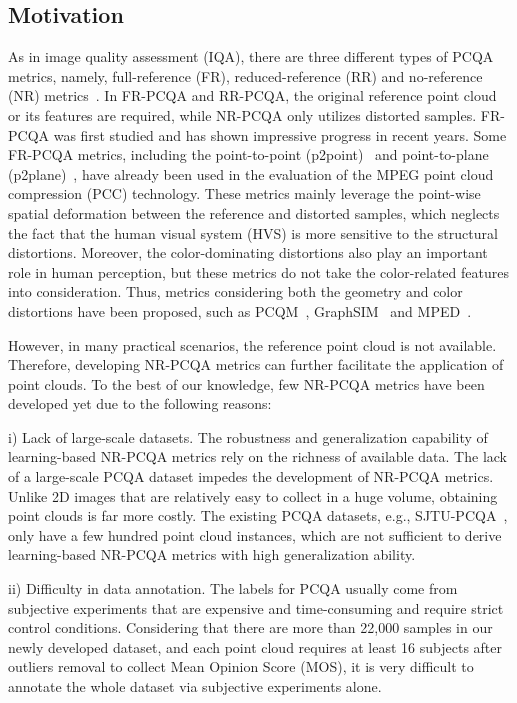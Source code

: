 \documentclass[acmsmall]{acmart}
\begin{document}
\subsection{Motivation}

\par As in image quality assessment (IQA), there are three different types of PCQA metrics, namely, full-reference (FR), reduced-reference (RR) and no-reference (NR) metrics~\cite{Min2021survey,Zhai2021survey}. In FR-PCQA and RR-PCQA, the original reference point cloud or its features are required, while NR-PCQA only utilizes distorted samples. FR-PCQA was first studied and has shown impressive progress in recent years. Some FR-PCQA metrics, including the point-to-point (p2point)~\cite{cignoni1998metro} and point-to-plane (p2plane)~\cite{Mekuria2016Evaluation}, have already been used in the evaluation of the MPEG point cloud compression (PCC) technology. These metrics mainly leverage the point-wise spatial deformation between the reference and distorted samples, which neglects the fact that the human visual system (HVS) is more sensitive to the structural distortions. Moreover, the color-dominating distortions also play an important role in human perception, but these metrics do not take the color-related features into consideration. Thus, metrics considering both the geometry and color distortions have been proposed, such as PCQM~\cite{meynet2020pcmd}, GraphSIM~\cite{yang2020graphsim} and MPED~\cite{yang2021MPED}.

\par However, in many practical scenarios, the reference point cloud is not available. Therefore, developing NR-PCQA metrics can further facilitate the application of point clouds. To the best of our knowledge, few NR-PCQA metrics have been developed yet due to the following reasons:

\par i) Lack of large-scale datasets. The robustness and generalization capability of learning-based NR-PCQA metrics rely on the richness of available data. The lack of a large-scale PCQA dataset impedes the development of NR-PCQA metrics. Unlike 2D images that are relatively easy to collect in a huge volume, obtaining point clouds is far more costly. The existing PCQA datasets, e.g., SJTU-PCQA~\cite{Yang2020TMM3DTO2D}, only have a few hundred point cloud instances, which are not sufficient to derive learning-based NR-PCQA metrics with high generalization ability.

\par ii) Difficulty in data annotation. The labels for PCQA usually come from subjective experiments that are expensive and time-consuming and require strict control conditions. Considering that there are more than 22,000 samples in our newly developed dataset, and each point cloud requires at least 16 subjects after outliers removal to collect Mean Opinion Score (MOS), it is very difficult to annotate the whole dataset via subjective experiments alone.
\end{document}
